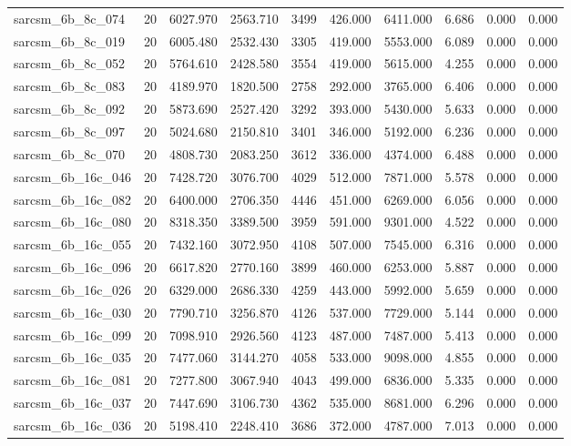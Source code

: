 \begin{tabular}{lrrrrrrrrr}
sarcsm\_6b\_8c\_074 & 20 & 6027.970 & 2563.710 & 3499 & 426.000 & 6411.000 & 6.686 & 0.000 & 0.000 \\
sarcsm\_6b\_8c\_019 & 20 & 6005.480 & 2532.430 & 3305 & 419.000 & 5553.000 & 6.089 & 0.000 & 0.000 \\
sarcsm\_6b\_8c\_052 & 20 & 5764.610 & 2428.580 & 3554 & 419.000 & 5615.000 & 4.255 & 0.000 & 0.000 \\
sarcsm\_6b\_8c\_083 & 20 & 4189.970 & 1820.500 & 2758 & 292.000 & 3765.000 & 6.406 & 0.000 & 0.000 \\
sarcsm\_6b\_8c\_092 & 20 & 5873.690 & 2527.420 & 3292 & 393.000 & 5430.000 & 5.633 & 0.000 & 0.000 \\
sarcsm\_6b\_8c\_097 & 20 & 5024.680 & 2150.810 & 3401 & 346.000 & 5192.000 & 6.236 & 0.000 & 0.000 \\
sarcsm\_6b\_8c\_070 & 20 & 4808.730 & 2083.250 & 3612 & 336.000 & 4374.000 & 6.488 & 0.000 & 0.000 \\
sarcsm\_6b\_16c\_046 & 20 & 7428.720 & 3076.700 & 4029 & 512.000 & 7871.000 & 5.578 & 0.000 & 0.000 \\
sarcsm\_6b\_16c\_082 & 20 & 6400.000 & 2706.350 & 4446 & 451.000 & 6269.000 & 6.056 & 0.000 & 0.000 \\
sarcsm\_6b\_16c\_080 & 20 & 8318.350 & 3389.500 & 3959 & 591.000 & 9301.000 & 4.522 & 0.000 & 0.000 \\
sarcsm\_6b\_16c\_055 & 20 & 7432.160 & 3072.950 & 4108 & 507.000 & 7545.000 & 6.316 & 0.000 & 0.000 \\
sarcsm\_6b\_16c\_096 & 20 & 6617.820 & 2770.160 & 3899 & 460.000 & 6253.000 & 5.887 & 0.000 & 0.000 \\
sarcsm\_6b\_16c\_026 & 20 & 6329.000 & 2686.330 & 4259 & 443.000 & 5992.000 & 5.659 & 0.000 & 0.000 \\
sarcsm\_6b\_16c\_030 & 20 & 7790.710 & 3256.870 & 4126 & 537.000 & 7729.000 & 5.144 & 0.000 & 0.000 \\
sarcsm\_6b\_16c\_099 & 20 & 7098.910 & 2926.560 & 4123 & 487.000 & 7487.000 & 5.413 & 0.000 & 0.000 \\
sarcsm\_6b\_16c\_035 & 20 & 7477.060 & 3144.270 & 4058 & 533.000 & 9098.000 & 4.855 & 0.000 & 0.000 \\
sarcsm\_6b\_16c\_081 & 20 & 7277.800 & 3067.940 & 4043 & 499.000 & 6836.000 & 5.335 & 0.000 & 0.000 \\
sarcsm\_6b\_16c\_037 & 20 & 7447.690 & 3106.730 & 4362 & 535.000 & 8681.000 & 6.296 & 0.000 & 0.000 \\
sarcsm\_6b\_16c\_036 & 20 & 5198.410 & 2248.410 & 3686 & 372.000 & 4787.000 & 7.013 & 0.000 & 0.000 \\

\end{tabular}
